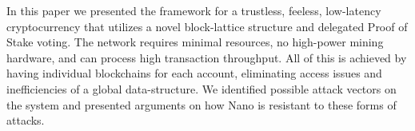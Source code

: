 In this paper we presented the framework for a trustless, feeless, low-latency cryptocurrency that utilizes a novel block-lattice structure and delegated Proof of Stake voting. The network requires minimal resources, no high-power mining hardware, and can process high transaction throughput. All of this is achieved by having individual blockchains for each account, eliminating access issues and inefficiencies of a global data-structure. We identified possible attack vectors on the system and presented arguments on how Nano is resistant to these forms of attacks.